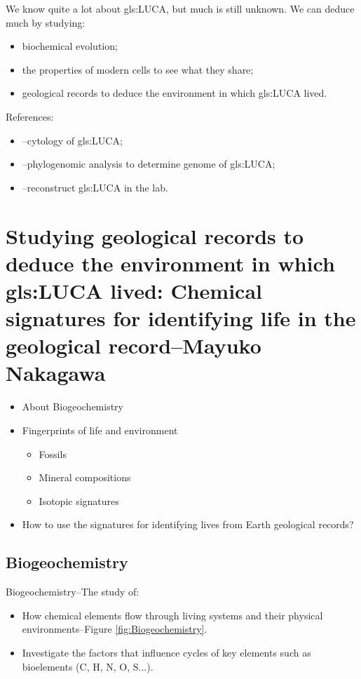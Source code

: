 \documentclass[]{article}
\begin{document}
We know quite a lot about \gls{gls:LUCA}, but much is still unknown. We can deduce much by studying:
\begin{itemize}
	\item biochemical evolution;
	\item the properties of modern cells to see what they share;
	\item geological records to deduce the environment in which \gls{gls:LUCA} lived.
\end{itemize}

References:
\begin{itemize}
	\item \cite{penny1999nature}--cytology of \gls{gls:LUCA};
	\item \cite{weiss2016physiology}--phylogenomic analysis to determine genome of \gls{gls:LUCA};
	\item \cite{torino2013piecing}--reconstruct \gls{gls:LUCA} in the lab.
\end{itemize}

\section[Deducing the environment in which LUCA lived]{Studying geological records to deduce the environment in which \gls{gls:LUCA} lived: Chemical signatures for identifying life in the geological record--Mayuko Nakagawa}

\begin{itemize}
	\item About Biogeochemistry
	\item Fingerprints of life and environment
	\begin{itemize}
		\item Fossils
		\item Mineral compositions
		\item Isotopic signatures
	\end{itemize}
	\item How to use the signatures for identifying lives from 	Earth geological records?
\end{itemize}

\subsection{Biogeochemistry}
Biogeochemistry--The study of:
\begin{itemize}
	\item How chemical elements flow through living systems and their physical environments--Figure \ref{fig:Biogeochemistry}.
	\item Investigate the factors that influence cycles of key 	elements such as bioelements (C, H, N, O, S...).
	
\end{itemize}
\end{document}
